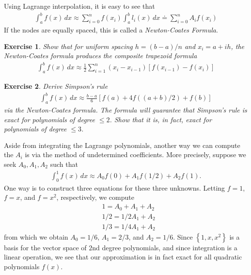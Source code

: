 \documentclass[12pt,reqno]{amsart}
\numberwithin{equation}{section}  %
\newtheorem{exercise}{Exercise}
\begin{document}
Using Lagrange interpolation, it is easy to see that
\begin{align*}
\int_a^b f(x)\, dx \approx \sum_{i=0}^n f(x_i)\int_a^b l_i(x)\, dx 
\doteq \sum_{i=0}^n A_i f(x_i)
\end{align*}
If the nodes are equally spaced, this is called a \emph{Newton-Coates Formula}.
\begin{exercise}
Show that for uniform spacing $h = (b-a)/n$ and $x_i = a + ih$,
the Newton-Coates formula produces the composite trapezoid formula
\begin{align*}
\int_a^b f(x) \, dx \approx \frac{1}{2}\sum_{i=1}^n
(x_i - x_{i-1})[f(x_{i-1}) - f(x_i)]
\end{align*}
\end{exercise}
\begin{exercise}
Derive Simpson's rule
\begin{align*}
\int_a^b f(x)\, dx \approx \frac{b-a}{6} \left [f(a) + 4f((a+b)/2) + f(b) \right]	
\end{align*}
via the Newton-Coates formula. The formula will guarantee that
Simpson's rule is exact for polynomials of degree $\le 2$. Show that it is,
in fact, exact for polynomials of degree $\le 3$.
\end{exercise}
Aside from integrating the Lagrange polynomials, another way we can
compute the $A_i$ is via the method of undetermined coefficients. More precisely,
suppose we seek $A_0, A_1, A_2$ such that
\begin{align*}
\int_0^1 f(x) \, dx \approx A_0 f(0) + A_1 f(1/2) + A_2 f(1).
\end{align*}
One way is to construct three equations for these three unknowns.
Letting $f = 1$, $f = x$, and $f = x^2$, respectively, we compute
\begin{align*}
& 1 = A_0 + A_1 + A_2
\\
& 1/2 = 1/2A_1 + A_2
\\
& 1/3 = 1/4A_1 + A_2
\end{align*}
from which we obtain $A_0 = 1/6$, $A_1 = 2/3$, and $A_2 = 1/6$.
Since $ \left\{ 1, x, x^2 \right\} $ is a basis for the vector space of 
$2$nd degree polynomials, and since integration is a linear operation, we see that our approximation is in fact exact
for all quadratic polynomials $f(x)$.
\end{document}
